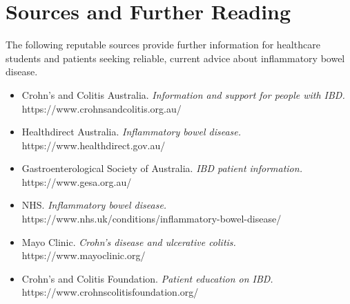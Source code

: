 \section*{Sources and Further Reading}
The following reputable sources provide further information for healthcare students and patients seeking reliable, current advice about inflammatory bowel disease.
\begin{itemize}
    \item Crohn's and Colitis Australia. \textit{Information and support for people with IBD.} https://www.crohnsandcolitis.org.au/
    \item Healthdirect Australia. \textit{Inflammatory bowel disease.} https://www.healthdirect.gov.au/
    \item Gastroenterological Society of Australia. \textit{IBD patient information.} https://www.gesa.org.au/
    \item NHS. \textit{Inflammatory bowel disease.} https://www.nhs.uk/conditions/inflammatory-bowel-disease/
    \item Mayo Clinic. \textit{Crohn's disease and ulcerative colitis.} https://www.mayoclinic.org/
    \item Crohn's and Colitis Foundation. \textit{Patient education on IBD.} https://www.crohnscolitisfoundation.org/
\end{itemize}
